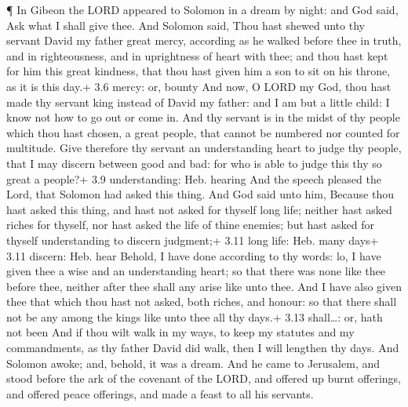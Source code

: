  ¶ In Gibeon the LORD appeared to Solomon in a dream by
night: and God said, Ask what I shall give thee.  And
Solomon said, Thou hast shewed unto thy servant David my father great
mercy, according as he walked before thee in truth, and in
righteousness, and in uprightness of heart with thee; and thou hast kept
for him this great kindness, that thou hast given him a son to sit on
his throne, as it is this day.+ 3.6 mercy: or, bounty  And
now, O LORD my God, thou hast made thy servant king instead of David my
father: and I am but a little child: I know not how to go out or come
in.  And thy servant is in the midst of thy people which
thou hast chosen, a great people, that cannot be numbered nor counted
for multitude.  Give therefore thy servant an understanding
heart to judge thy people, that I may discern between good and bad: for
who is able to judge this thy so great a people?+ 3.9 understanding:
Heb. hearing  And the speech pleased the Lord, that Solomon
had asked this thing.  And God said unto him, Because thou
hast asked this thing, and hast not asked for thyself long life; neither
hast asked riches for thyself, nor hast asked the life of thine enemies;
but hast asked for thyself understanding to discern judgment;+ 3.11 long
life: Heb. many days+ 3.11 discern: Heb. hear  Behold, I
have done according to thy words: lo, I have given thee a wise and an
understanding heart; so that there was none like thee before thee,
neither after thee shall any arise like unto thee.  And I
have also given thee that which thou hast not asked, both riches, and
honour: so that there shall not be any among the kings like unto thee
all thy days.+ 3.13 shall\ldots: or, hath not been  And if
thou wilt walk in my ways, to keep my statutes and my commandments, as
thy father David did walk, then I will lengthen thy days. 
And Solomon awoke; and, behold, it was a dream. And he came to
Jerusalem, and stood before the ark of the covenant of the LORD, and
offered up burnt offerings, and offered peace offerings, and made a
feast to all his servants.

